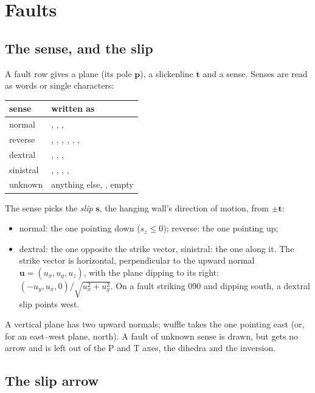 \section{Faults}\label{sec:m-faults}

\subsection{The sense, and the slip}

A fault row gives a plane (its pole $\mathbf{p}$), a slickenline $\mathbf{t}$ and a sense. Senses are
read as words or single characters:
\begin{center}\small
\begin{tabularx}{\linewidth}{@{}lL@{}}\toprule
\sffamily\bfseries sense & \sffamily\bfseries written as \\\midrule
normal & , , , \code{-} \\
reverse & , , , , , , \code{+} \\
dextral & , , ,  \\
sinistral & , , , ,  \\
unknown & anything else, , empty \\
\bottomrule\end{tabularx}
\end{center}
The sense picks the \emph{slip} $\mathbf{s}$, the hanging wall's direction of motion, from $\pm\mathbf{t}$:
\begin{itemize}
\item normal: the one pointing down ($s_z \le 0$); reverse: the one pointing up;
\item dextral: the one opposite the strike vector, sinistral: the one along it. The strike vector is
horizontal, perpendicular to the upward normal $\mathbf{u} = (u_x, u_y, u_z)$, with the plane dipping to
its right: $(-u_y, u_x, 0)/\sqrt{u_x^2 + u_y^2}$. On a fault striking 090 and dipping south, a dextral
slip points west.
\end{itemize}
A vertical plane has two upward normals; wuffle takes the one pointing east (or, for an east--west plane,
north). A fault of unknown sense is drawn, but gets no arrow and is left out of the P and T axes, the
dihedra and the inversion.

\subsection{The slip arrow}


